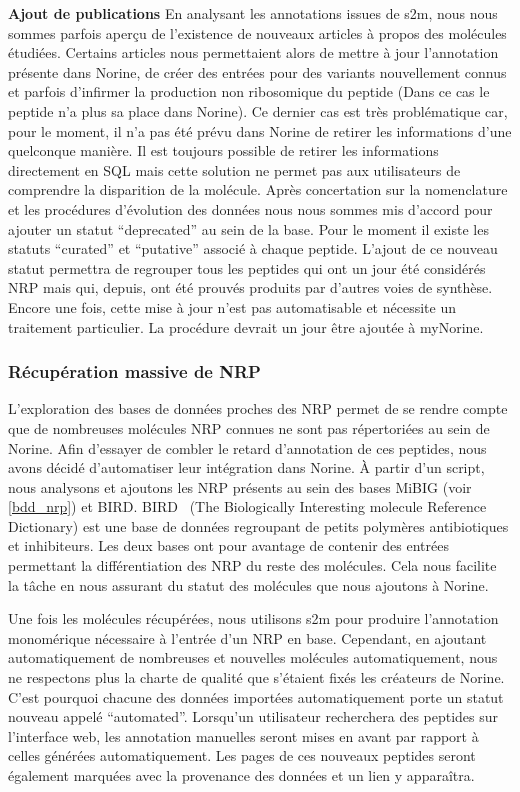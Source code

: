 \textbf{Ajout de publications}
En analysant les annotations issues de s2m, nous nous sommes parfois aperçu de l'existence de nouveaux articles à propos des molécules étudiées.
Certains articles nous permettaient alors de mettre à jour l'annotation présente dans Norine, de créer des entrées pour des variants nouvellement connus et parfois d'infirmer la production non ribosomique du peptide (Dans ce cas le peptide n'a plus sa place dans Norine).
Ce dernier cas est très problématique car, pour le moment, il n'a pas été prévu dans Norine de retirer les informations d'une quelconque manière.
Il est toujours possible de retirer les informations directement en SQL mais cette solution ne permet pas aux utilisateurs de comprendre la disparition de la molécule.
Après concertation sur la nomenclature et les procédures d'évolution des données nous nous sommes mis d'accord pour ajouter un statut ``deprecated'' au sein de la base.
Pour le moment il existe les statuts ``curated'' et ``putative'' associé à chaque peptide.
L'ajout de ce nouveau statut permettra de regrouper tous les peptides qui ont un jour été considérés NRP mais qui, depuis, ont été prouvés produits par d'autres voies de synthèse.
Encore une fois, cette mise à jour n'est pas automatisable et nécessite un traitement particulier.
La procédure devrait un jour être ajoutée à myNorine.


\subsubsection{Récupération massive de NRP}
\label{nor_fill}

L'exploration des bases de données proches des NRP permet de se rendre compte que de nombreuses molécules NRP connues ne sont pas répertoriées au sein de Norine.
Afin d'essayer de combler le retard d'annotation de ces peptides, nous avons décidé d'automatiser leur intégration dans Norine.
À partir d'un script, nous analysons et ajoutons les NRP présents au sein des bases MiBIG (voir \ref{bdd_nrp}) et BIRD.
BIRD~\cite{young_chemical_2013} (The Biologically Interesting molecule Reference Dictionary) est une base de données regroupant de petits polymères antibiotiques et inhibiteurs.
Les deux bases ont pour avantage de contenir des entrées permettant la différentiation des NRP du reste des molécules.
Cela nous facilite la tâche en nous assurant du statut des molécules que nous ajoutons à Norine.

Une fois les molécules récupérées, nous utilisons s2m pour produire l'annotation monomérique nécessaire à l'entrée d'un NRP en base.
Cependant, en ajoutant automatiquement de nombreuses et nouvelles molécules automatiquement, nous ne respectons plus la charte de qualité que s'étaient fixés les créateurs de Norine.
C'est pourquoi chacune des données importées automatiquement porte un statut nouveau appelé ``automated''.
Lorsqu'un utilisateur recherchera des peptides sur l'interface web, les annotation manuelles seront mises en avant par rapport à celles générées automatiquement.
Les pages de ces nouveaux peptides seront également marquées avec la provenance des données et un lien y apparaîtra.


